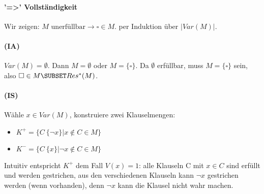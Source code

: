 \paragraph[]{'=>' Vollständigkeit}
Wir zeigen: $M \text{ unerfüllbar} \rightarrow \square \in M$.
per Induktion über $|Var(M)|$.

\paragraph[]{(IA)}
$Var(M) = \emptyset$. Dann $M=\emptyset$ oder $M=\{ \square \}$. Da $\emptyset$ erfüllbar, muss $M=\{ \square \}$ sein, also $\square \in M \SUBSET Res^*(M)$.

\paragraph[]{(IS)}
Wähle $x \in Var(M)$, konstruiere zwei Klauselmengen:
\begin{itemize}
\item $K^+ = \{C\ \{\neg x\} | x \not\in C \in M \}$ \\
\item $K^- = \{C\ \{x\} | \neg x \not\in C \in M \}$
\end{itemize}
Intuitiv entspricht $K^+$ dem Fall $V(x)=1$: alle Klauseln C mit $x \in C$ sind erfüllt und werden gestrichen, aus den verschiedenen Klauseln kann $\neg x$ gestrichen werden (wenn vorhanden), denn $\neg x$ kann die Klausel nicht wahr machen.

